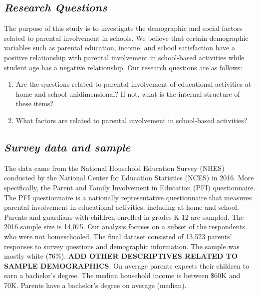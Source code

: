 \documentclass[
]{article}
\providecommand{\tightlist}{%
  \setlength{\itemsep}{0pt}\setlength{\parskip}{0pt}}
\begin{document}
\hypertarget{research-questions}{%
\subsection{\texorpdfstring{\textbf{\emph{Research
Questions}}}{Research Questions}}\label{research-questions}}

The purpose of this study is to investigate the demographic and social
factors related to parental involvement in schools. We believe that
certain demographic variables such as parental education, income, and
school satisfaction have a positive relationship with parental
involvement in school-based activities while student age has a negative
relationship. Our research questions are as follows:

\begin{enumerate}
\def\labelenumi{\arabic{enumi}.}
\tightlist
\item
  Are the questions related to parental involvement of educational
  activities at home and school unidimensional? If not, what is the
  internal structure of these items?
\item
  What factors are related to parental involvement in school-based
  activities?
\end{enumerate}

\hypertarget{survey-data-and-sample}{%
\subsection{\texorpdfstring{\textbf{\emph{Survey data and
sample}}}{Survey data and sample}}\label{survey-data-and-sample}}

The data came from the National Household Education Survey (NHES)
conducted by the National Center for Education Statistics (NCES) in
2016. More specifically, the Parent and Family Involvement in Education
(PFI) questionnaire. The PFI questionnaire is a nationally
representative questionnaire that measures parental involvement in
educational activities, including at home and school. Parents and
guardians with children enrolled in grades K-12 are sampled. The 2016
sample size is 14,075. Our analysis focuses on a subset of the
respondents who were not homeschooled. The final dataset consisted of
13,523 parents' responses to survey questions and demographic
information. The sample was mostly white (76\%). \textbf{ADD OTHER
DESCRIPTIVES RELATED TO SAMPLE DEMOGRAPHICS}. On average parents expects
their children to earn a bachelor's degree. The median household income
is between \$60K and 70K. Parents have a bachelor's degree on average
(median).
\end{document}
